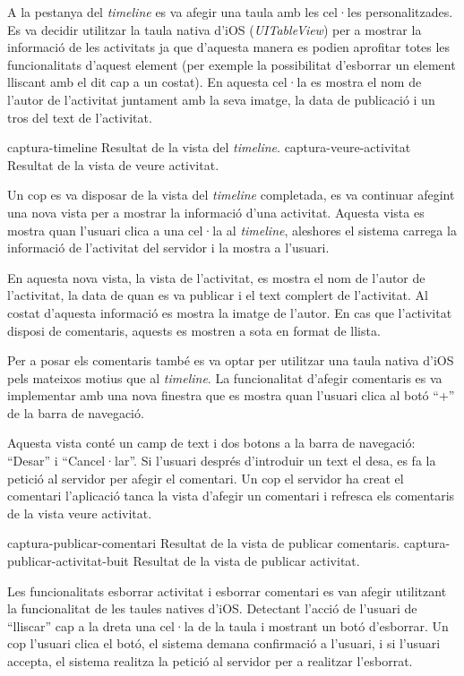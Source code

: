 A la pestanya del \textit{timeline} es va afegir una taula amb les cel·les personalitzades. Es va decidir utilitzar la taula nativa d'iOS (\textit{UITableView}) per a mostrar la informació de les activitats ja que d'aquesta manera es podien aprofitar totes les funcionalitats d'aquest element (per exemple la possibilitat d'esborrar un element lliscant amb el dit cap a un costat). En aquesta cel·la es mostra el nom de l'autor de l'activitat juntament amb la seva imatge, la data de publicació i un tros del text de l'activitat.

\pintaDosImatges
    {captura-timeline}
        {Resultat de la vista del \textit{timeline}.}
    {captura-veure-activitat}
        {Resultat de la vista de veure activitat.}

Un cop es va disposar de la vista del \textit{timeline} completada, es va continuar afegint una nova vista per a mostrar la informació d'una activitat. Aquesta vista es mostra quan l'usuari clica a una cel·la al \textit{timeline}, aleshores el sistema carrega la informació de l'activitat del servidor i la mostra a l'usuari.

En aquesta nova vista, la vista de l'activitat, es mostra el nom de l'autor de l'activitat, la data de quan es va publicar i el text complert de l'activitat. Al costat d'aquesta informació es mostra la imatge de l'autor. En cas que l'activitat disposi de comentaris, aquests es mostren a sota en format de llista. 

Per a posar els comentaris també es va optar per utilitzar una taula nativa d'iOS pels mateixos motius que al \textit{timeline}.
La funcionalitat d'afegir comentaris es va implementar amb una nova finestra que es mostra quan l'usuari clica al botó ``+'' de la barra de navegació.


Aquesta vista conté un camp de text i dos botons a la barra de navegació: ``Desar'' i ``Cancel·lar''. Si l'usuari després d'introduir un text el desa, es fa la petició al servidor per afegir el comentari. Un cop el servidor ha creat el comentari l'aplicació tanca la vista d'afegir un comentari i refresca els comentaris de la vista veure activitat.


\pintaDosImatges
    {captura-publicar-comentari}
        {Resultat de la vista de publicar comentaris.}
    {captura-publicar-activitat-buit}
        {Resultat de la vista de publicar activitat.}


Les funcionalitats esborrar activitat i esborrar comentari es van afegir utilitzant la funcionalitat de les taules natives d'iOS. Detectant l'acció de l'usuari de ``lliscar'' cap a la dreta una cel·la de la taula i mostrant un botó d'esborrar. Un cop l'usuari clica el botó, el sistema demana confirmació a l'usuari, i si l'usuari accepta, el sistema realitza la petició al servidor per a realitzar l'esborrat.

